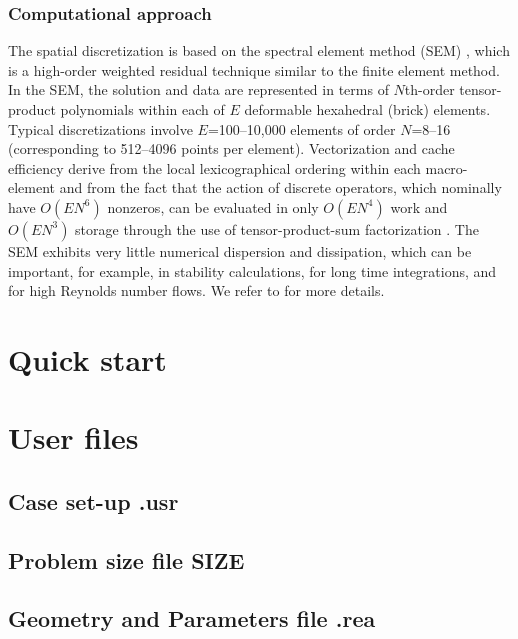 \documentclass[11pt]{report}              %
\begin{document}
\subsection*{Computational approach}
The spatial discretization is based on the spectral element method (SEM) \cite{pat84}, which is a high-order weighted residual technique similar to the finite element method.   
In the SEM, the solution and data are represented in terms of 
\(N\)th-order tensor-product polynomials within each of \(E\) deformable 
hexahedral (brick) elements. Typical discretizations involve \(E\)=100--10,000 elements of order 
\(N\)=8--16 (corresponding to 512--4096 points per element).
Vectorization and cache efficiency derive from the local lexicographical
ordering within each macro-element and from the fact that the action of
discrete operators, which nominally have \(O(EN^6)\) nonzeros, can be evaluated
in only \(O(EN^4)\) work and \(O(EN^3)\) storage through the use of 
tensor-product-sum factorization \cite{sao80}.   The SEM exhibits 
very little numerical dispersion and dissipation, which can be important, 
for example, in stability calculations, for long time integrations, 
and for high Reynolds number flows. We refer to \cite{dfm02} for more
details.



%

\chapter{Quick start}



\chapter{User files}
\section{Case set-up .usr}

\section{Problem size file SIZE}

\section{Geometry and Parameters file .rea}
\end{document}

